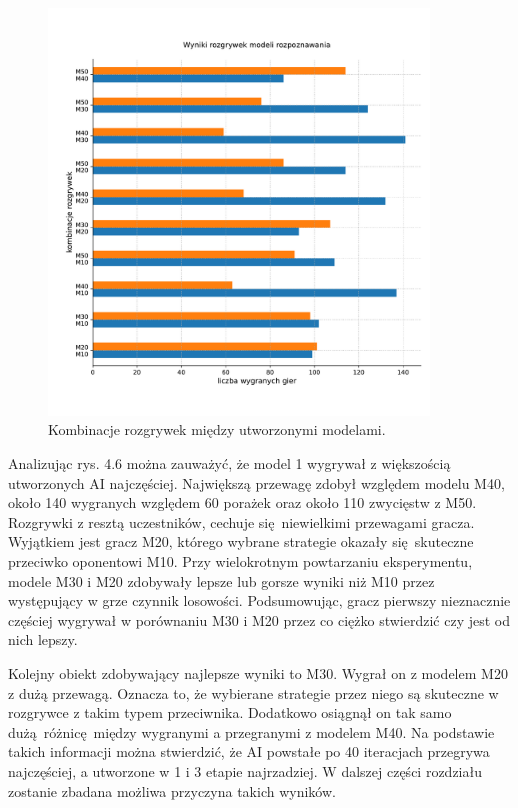\documentclass[12pt,oneside,a4paper]{report}
\begin{document}
\begin{figure}[!ht]
  \centering
  \hspace*{-1cm}   
  \includegraphics[width=0.9\textwidth]{./img/mecze.pdf}
  \caption{Kombinacje rozgrywek między utworzonymi modelami.}
\end{figure}


\vspace{3cm}
Analizując rys. 4.6 można zauważyć, że model 1 wygrywał z większością utworzonych AI najczęściej.
Największą przewagę  
zdobył względem modelu M40, około 140 wygranych względem 60 porażek oraz około 110 zwycięstw z
M50. Rozgrywki z resztą
uczestników, 
cechuje się niewielkimi przewagami gracza.
Wyjątkiem jest gracz M20, którego wybrane strategie okazały się skuteczne przeciwko oponentowi M10.
Przy wielokrotnym powtarzaniu eksperymentu, modele M30 i
M20 zdobywały lepsze lub gorsze wyniki niż M10 przez występujący w grze czynnik losowości. Podsumowując,
gracz pierwszy nieznacznie częściej wygrywał w porównaniu M30 i M20
przez co ciężko stwierdzić czy jest od nich lepszy.

Kolejny obiekt zdobywający najlepsze wyniki
to M30. Wygrał on z modelem M20 z dużą przewagą. Oznacza to, że wybierane strategie przez niego
są skuteczne w rozgrywce z takim typem przeciwnika. Dodatkowo osiągnął on tak samo 
dużą różnicę między wygranymi a przegranymi z modelem M40. 
Na podstawie takich informacji można stwierdzić, że AI powstałe po 40 iteracjach przegrywa
najczęściej,
a
utworzone w 1 i 3 etapie najrzadziej. W
dalszej części rozdziału zostanie zbadana możliwa przyczyna takich wyników.
\end{document}
